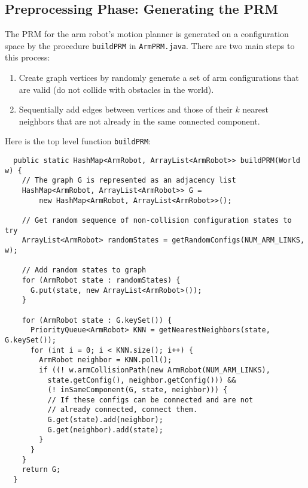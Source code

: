 \documentclass{article}
\begin{document}
\subsection{Preprocessing Phase: Generating the PRM}

The PRM for the arm robot's motion planner is generated on a configuration space by the procedure \verb`buildPRM` in \verb`ArmPRM.java`. There are two main steps to this process:

\begin{enumerate}
\item Create graph vertices by randomly generate a set of arm configurations that are valid (do not collide with obstacles in the world).
\item Sequentially add edges between vertices and those of their $k$ nearest neighbors that are not already in the same connected component.
\end{enumerate}

Here is the top level function \verb`buildPRM`:

\vspace{5mm}

\begin{lstlisting}
  public static HashMap<ArmRobot, ArrayList<ArmRobot>> buildPRM(World w) {
    // The graph G is represented as an adjacency list
    HashMap<ArmRobot, ArrayList<ArmRobot>> G = 
        new HashMap<ArmRobot, ArrayList<ArmRobot>>();
    
    // Get random sequence of non-collision configuration states to try
    ArrayList<ArmRobot> randomStates = getRandomConfigs(NUM_ARM_LINKS, w);
    
    // Add random states to graph
    for (ArmRobot state : randomStates) {
      G.put(state, new ArrayList<ArmRobot>());
    }
    
    for (ArmRobot state : G.keySet()) {
      PriorityQueue<ArmRobot> KNN = getNearestNeighbors(state, G.keySet());
      for (int i = 0; i < KNN.size(); i++) {
        ArmRobot neighbor = KNN.poll();
        if ((! w.armCollisionPath(new ArmRobot(NUM_ARM_LINKS), 
          state.getConfig(), neighbor.getConfig())) && 
          (! inSameComponent(G, state, neighbor))) {
          // If these configs can be connected and are not
          // already connected, connect them.
          G.get(state).add(neighbor);
          G.get(neighbor).add(state);
        }
      }
    }
    return G;
  }
\end{lstlisting}

\vspace{5mm}
\end{document}
